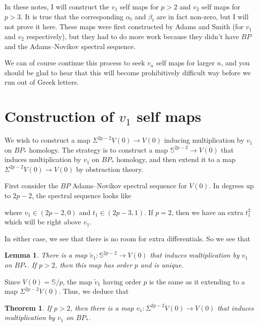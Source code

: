 \documentclass{shortart}
\newtheorem*{thm}{Theorem}
\newtheorem*{lemma}{Lemma}
\theoremstyle{definition}
\renewcommand\S{\mathbb{S}}
\begin{document}
In these notes, I will construct the $v_1$ self maps for $p > 2$ and $v_2$ self maps for $p > 3$. It is true that the corresponding $\alpha_t$ and $\beta_t$ are in fact non-zero, but I will not prove it here. These maps were first constructed by Adams and Smith (for $v_1$ and $v_2$ respectively), but they had to do more work because they didn't have $BP$ and the Adams--Novikov spectral sequence.

We can of course continue this process to seek $v_n$ self maps for larger $n$, and you should be glad to hear that this will become prohibitively difficult way before we run out of Greek letters.
\section{Construction of \texorpdfstring{$v_1$}{v1} self maps}
We wish to construct a map $\Sigma^{2p - 2} V(0) \to V(0)$ inducing multiplication by $v_1$ on $BP_*$ homology. The strategy is to construct a map $\S^{2p - 2} \to V(0)$ that induces multiplication by $v_1$ on $BP_*$ homology, and then extend it to a map $\Sigma^{2p - 2}V(0) \to V(0)$ by obstruction theory.

First consider the $BP$ Adams--Novikov spectral sequence for $V(0)$. In degrees up to $2p - 2$, the spectral sequence looks like
\begin{center}
\end{center}
where $v_1 \in (2p - 2, 0)$ and $t_1 \in (2p - 3, 1)$. If $p = 2$, then we have an extra $t_1^2$ which will be right above $v_1$.

In either case, we see that there is no room for extra differentials. So we see that
\begin{lemma}
  There is a map $\tilde{v}_1: \S^{2p - 2} \to V(0)$ that induces multiplication by $v_1$ on $BP_*$. If $p > 2$, then this map has order $p$ and is unique.\fakeqed
\end{lemma}
Since $V(0) = \S/p$, the map $\tilde{v}_1$ having order $p$ is the same as it extending to a map $\Sigma^{2p - 2} V(0)$. Thus, we deduce that
\begin{thm}
  If $p > 2$, then there is a map $v_1: \Sigma^{2p - 2} V(0) \to V(0)$ that induces multiplication by $v_1$ on $BP_*$.
\end{thm}
\end{document}
